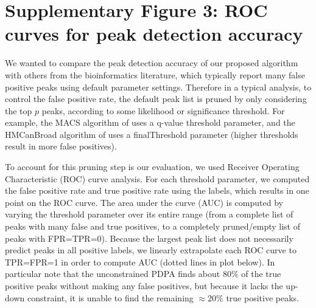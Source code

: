 \documentclass{article}
\begin{document}


\section*{Supplementary Figure 3: ROC curves for peak detection accuracy}
  
We wanted to compare the peak detection accuracy of our proposed
algorithm with others from the bioinformatics literature, which
typically report many false positive peaks using default parameter
settings. Therefore in a typical analysis, to control
the false positive rate, the default peak list is pruned by only
considering the top $p$ peaks, according to some likelihood or
significance threshold. For example, the MACS algorithm of
\citet{MACS} uses a q-value threshold parameter, and the HMCanBroad
algorithm of \citet{HMCan} uses a finalThreshold parameter (higher
thresholds result in more false positives). 

To account for this pruning step is our evaluation, we used Receiver
Operating Characteristic (ROC) curve analysis. For each threshold
parameter, we computed the false positive rate and true positive rate
using the labels, which results in one point on the ROC curve. The
area under the curve (AUC) is computed by varying the threshold
parameter over its entire range (from a complete list of peaks with
many false and true positives, to a completely pruned/empty list of
peaks with FPR=TPR=0).
Because the largest peak list does not necessarily predict peaks in
all positive labels, we linearly extrapolate each ROC curve to
TPR=FPR=1 in order to compute AUC (dotted lines in plot below). 
In particular note that the unconstrained PDPA finds about 80\% of the true positive peaks
without making any false positives, but because it lacks the up-down constraint, 
it is unable to find the remaining $\approx 20\%$ true positive peaks.
\end{document}
